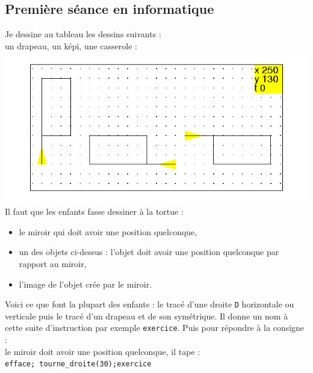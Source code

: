 \documentclass[a4paper,11pt]{book}
\begin{document}
\subsection{Premi\`ere s\'eance en informatique}
Je dessine au tableau les dessins suivants :\\
un drapeau, un k\'epi, une casserole :\\
%
\includegraphics[width=\textwidth]{tortkepi}\\
Il faut que les enfants fasse dessiner \`a la tortue :
\begin{itemize}
\item le miroir qui doit avoir une position quelconque,
\item un des objets ci-dessus : l'objet doit avoir une position quelconque par
 rapport au miroir,
\item l'image de l'objet  cr\'ee par le miroir. 
\end{itemize}
Voici ce que font la plupart des enfants :
le trac\'e d'une droite {\tt D} horizontale ou verticale puis le trac\'e d'un 
drapeau et de son sym\'etrique. Il donne un nom \`a cette suite d'instruction par exemple {\tt exercice}. Puis pour r\'epondre \`a la consigne :\\
le miroir doit avoir une position quelconque, il tape :\\
{\tt efface; tourne\_droite(30);exercice} 
\end{document}
